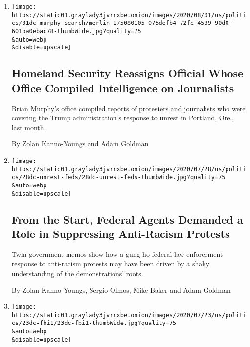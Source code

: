 \begin{enumerate}
\def\labelenumi{\arabic{enumi}.}
\item
  \href{/2020/08/01/us/politics/brian-murphy-homeland-security-protesters.html}{}

  \texttt{[image: https://static01.graylady3jvrrxbe.onion/images/2020/08/01/us/politics/01dc-murphy-search/merlin\_175080105\_075defb4-72fe-4589-90d0-601ba0ebac78-thumbWide.jpg?quality=75\\\&auto=webp\\\&disable=upscale]}

  \hypertarget{homeland-security-reassigns-official-whose-office-compiled-intelligence-on-journalists}{%
  \subsection{Homeland Security Reassigns Official Whose Office Compiled
  Intelligence on
  Journalists}\label{homeland-security-reassigns-official-whose-office-compiled-intelligence-on-journalists}}

  Brian Murphy's office compiled reports of protesters and journalists
  who were covering the Trump administration's response to unrest in
  Portland, Ore., last month.

  By Zolan Kanno-Youngs and Adam Goldman
\item
  \href{/2020/07/28/us/federal-agents-portland-seattle-protests.html}{}

  \texttt{[image: https://static01.graylady3jvrrxbe.onion/images/2020/07/28/us/politics/28dc-unrest-feds/28dc-unrest-feds-thumbWide.jpg?quality=75\\\&auto=webp\\\&disable=upscale]}

  \hypertarget{from-the-start-federal-agents-demanded-a-role-in-suppressing-anti-racism-protests}{%
  \subsection{From the Start, Federal Agents Demanded a Role in
  Suppressing Anti-Racism
  Protests}\label{from-the-start-federal-agents-demanded-a-role-in-suppressing-anti-racism-protests}}

  Twin government memos show how a gung-ho federal law enforcement
  response to anti-racism protests may have been driven by a shaky
  understanding of the demonstrations' roots.

  By Zolan Kanno-Youngs, Sergio Olmos, Mike Baker and Adam Goldman
\item
  \href{/2020/07/25/us/politics/igor-danchenko-steele-dossier.html}{}

  \texttt{[image: https://static01.graylady3jvrrxbe.onion/images/2020/07/23/us/politics/23dc-fbi1/23dc-fbi1-thumbWide.jpg?quality=75\\\&auto=webp\\\&disable=upscale]}


\end{enumerate}
